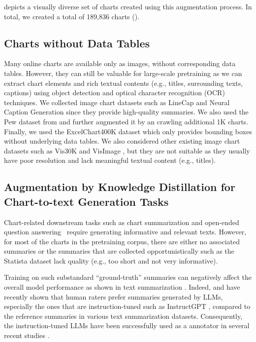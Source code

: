 { depicts a visually diverse set of charts created using this augmentation process. In total, we created a total of 189,836 charts ().



\subsection{Charts without Data Tables}
Many online charts are available only as images, without corresponding data tables.
However,  they can still be valuable for large-scale pretraining as we can extract chart elements and rich textual contents (e.g., titles, surrounding texts, captions) using object detection and optical character recognition (OCR) techniques. We collected image chart datasets such as LineCap \cite{mahinpei2022linecap} and Neural Caption Generation \cite{Andrea-carenini} 
since they provide high-quality summaries. We also used the Pew dataset from \cite{chart-to-text-acl} and further augmented it by an crawling additional 1K charts.
Finally, we used the ExcelChart400K dataset \cite{ChartOCR} which only provides bounding boxes without underlying data tables. We also considered other existing image chart datasets such as Vis30K \cite{chen2021vis30k} and VisImage \cite{deng2020visimages}, 
but they are not suitable as they usually have poor resolution and lack meaningful textual content (e.g., titles). 



\subsection{Augmentation by Knowledge Distillation for Chart-to-text Generation Tasks}
\label{subsec:knowledge_distillation}


Chart-related downstream tasks such as chart summarization \cite{chart-to-text-acl} and open-ended question answering~\cite{open-CQA} require generating informative and relevant texts. However, 
for most of the charts in the pretraining corpus, there are either no associated summaries or the summaries that are collected opportunistically such as the Statista dataset \cite{chart-to-text-acl} lack quality (e.g., too short and not very informative). {Training on such substandard ``ground-truth'' summaries can negatively affect the overall model performance as shown in text summarization \cite{kryscinski-etal-2019-neural,clark-etal-2021-thats}. Indeed, \citet{goyal2022news} and \citet{yixin-acl23} have recently shown that human raters prefer summaries generated by LLMs, especially the ones that are instruction-tuned such as InstructGPT \cite{instructgpt}, compared to the reference summaries in various text summarization datasets. Consequently, the instruction-tuned LLMs have been successfully used as a 
annotator in several recent studies \cite{Ding-acl-23,qin2023chatgpt}.



}}
